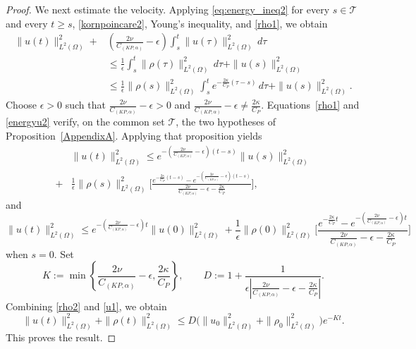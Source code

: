 \documentclass[10pt,a4paper]{amsart}
\begin{document}
\begin{proof}
We next estimate the velocity. Applying \eqref{eq:energy_ineq2} for every $s\in\mathcal T$ and every $t\ge s$, \eqref{kornpoincare2}, Young's inequality, and \eqref{rho1}, we obtain 
\begin{equation}\label{energyu2}
\begin{split}
\|u(t)\|^2_{L^2(\Omega)}+&(\frac{2\nu}{C_{(KP,\alpha)}}-\epsilon)\int_s^t\|u(\tau)\|^2_{L^2(\Omega)}\,d\tau 
\\&\le \frac{1}{\epsilon}\int_s^t\|\rho(\tau)\|^2_{L^2{(\Omega)}}\,d\tau+\|u(s)\|^2_{L^2(\Omega)}\\& \le\frac{1}{\epsilon}\|\rho(s)\|^2_{L^2(\Omega)}\int_s^te^{-\frac{2\kappa}{C_P}(\tau-s)}\,d\tau+\|u(s)\|^2_{L^2(\Omega)}.
\end{split}
\end{equation}
Choose $\epsilon>0$ such that $\frac{2\nu}{C_{(KP,\alpha)}}-\epsilon>0$ and $\frac{2\nu}{C_{(KP,\alpha)}}-\epsilon\neq \frac{2\kappa}{C_P}$. Equations~\eqref{rho1} and \eqref{energyu2} verify, on the common set $\mathcal T$, the two hypotheses of Proposition~\ref{AppendixA}.  Applying that proposition yields
\begin{equation}\label{u0}
\begin{split}
    &\|u(t)\|^2_{L^2(\Omega)}\le e^{-(\frac{2\nu}{C_{(KP,\alpha)}}-\epsilon)(t-s)}\|u(s)\|^2_{L^2(\Omega)}\\
    +&\frac{1}{\epsilon}\|\rho(s)\|^2_{L^2(\Omega)}\big[\frac{e^{-\frac{2\kappa}{C_P}(t-s)}-e^{-(\frac{2\nu}{C_{(KP,\alpha)}}-\epsilon)(t-s)}}{\frac{2\nu}{C_{(KP,\alpha)}}-\epsilon-\frac{2\kappa}{C_P}}\big],
\end{split}
\end{equation}
and
\begin{equation}\label{u1}
    \|u(t)\|^2_{L^2(\Omega)}\le e^{-(\frac{2\nu}{C_{(KP,\alpha)}}-\epsilon)t}\|u(0)\|^2_{L^2(\Omega)}+\frac{1}{\epsilon}\|\rho(0)\|^2_{L^2(\Omega)}\big[\frac{e^{-\frac{2\kappa}{C_P}t}-e^{-(\frac{2\nu}{C_{(KP,\alpha)}}-\epsilon)t}}{\frac{2\nu}{C_{(KP,\alpha)}}-\epsilon-\frac{2\kappa}{C_P}}\big]
\end{equation}
when $s=0$.
Set
\[
K:=\min\left\{\frac{2\nu}{C_{(KP,\alpha)}}-\epsilon,\frac{2\kappa}{C_P}\right\},
\qquad
D:=1+\frac{1}{\epsilon\left|\frac{2\nu}{C_{(KP,\alpha)}}-\epsilon-\frac{2\kappa}{C_P}\right|}.
\]
Combining \eqref{rho2} and \eqref{u1}, we obtain
\[
\|u(t)\|_{L^2(\Omega)}^2+\|\rho(t)\|_{L^2(\Omega)}^2
\le
D\bigl(\|u_0\|_{L^2(\Omega)}^2+\|\rho_0\|_{L^2(\Omega)}^2\bigr)e^{-Kt}.
\]
This proves the result.
\end{proof}
\end{document}
